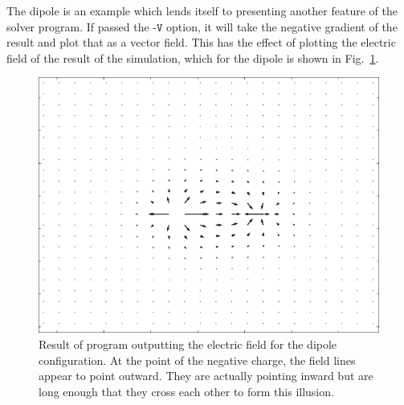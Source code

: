 The dipole is an example which lends itself to presenting another feature of the solver program. If passed the
$\texttt{-V}$ option, it will take the negative gradient of the result and plot that as a vector field. This has
the effect of plotting the electric field of the result of the simulation, which for the dipole is shown in
Fig.~\ref{fig:dipole-field}.

	\begin{figure}[h]
	\centering
	\includegraphics[width=0.7\linewidth]{dipole_field.pdf}
		\caption[Result of program outputting the electric field for the dipole configuration.]{Result of program outputting the electric field for the dipole configuration. At the point of the negative charge,
		the field lines appear to point outward. They are actually pointing inward but are long enough that they cross each other to form this illusion.} \label{fig:dipole-field}
	\end{figure}


